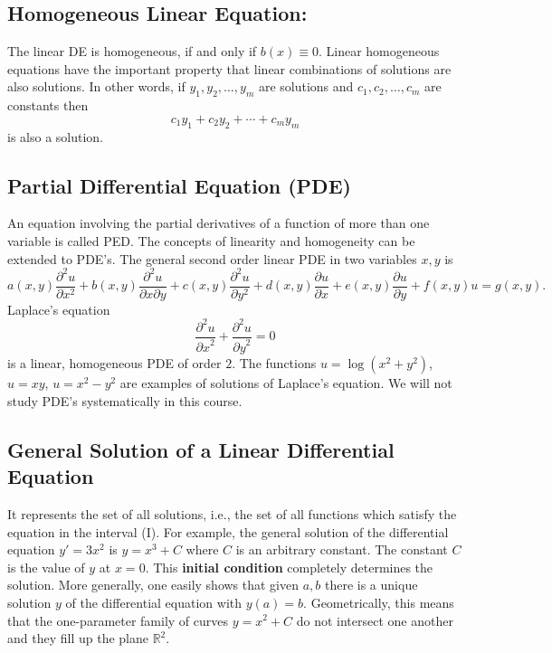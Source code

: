 \documentclass[letterpaper]{article}
\newcommand{\R}{{\mathbb R}}
\begin{document}
\subsection{Homogeneous Linear Equation:}
 The linear DE is homogeneous, if and only if $b(x)\equiv 0$. Linear
homogeneous equations have the important property that linear
combinations of solutions are also solutions. In other words, if
$y_1,y_2,\ldots,y_m$ are solutions and $c_1,c_2,\ldots,c_m$ are
constants then
$$c_1y_1+c_2y_2+\cdots+c_my_m$$
is also a solution.

\subsection{Partial Differential Equation (PDE)} An
equation involving the partial derivatives of a function of more
than one variable is called PED. The concepts of linearity and
homogeneity can be extended to PDE's. The general second order
linear PDE in two variables $x,y$ is
$$
a(x,y)\frac{\partial^2u}{\partial
x^2}+b(x,y)\frac{\partial^2u}{\partial x\partial
y}+c(x,y)\frac{\partial^2u}{\partial y^2}+d(x,y)\frac{\partial
u}{\partial x}+e(x,y)\frac{\partial u}{\partial y}+f(x,y)u=g(x,y).
$$
Laplace's equation
$$\frac{\partial^2 u}{{\partial x}^2}+
\frac{\partial^2 u}{{\partial y}^2}=0$$ is a linear, homogeneous
PDE of order $2$. The functions $u=\log(x^2+y^2)$, $u=xy$,
$u=x^2-y^2$ are examples of solutions of Laplace's equation. We
will not study PDE's systematically in this course.

\subsection{General Solution of a Linear Differential Equation} It
represents the set of all solutions, i.e., the set of all
functions which satisfy the equation in the interval (I).
 For
example, the general solution of the differential equation
$y'=3x^2$ is $y=x^3+C$ where $C$ is an arbitrary constant. The
constant $C$ is the value of $y$ at $x=0$. This {\bf initial
condition} completely determines the solution. More generally, one
easily shows that given $a,b$ there is a unique solution $y$ of
the differential equation with $y(a)=b$. Geometrically, this means
that the one-parameter family of curves $y=x^2 + C$ do not
intersect one another and they fill up the plane $\R^2$.
\end{document}
